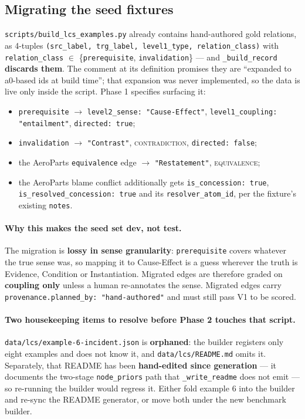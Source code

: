 \documentclass[11pt]{article}
\newcommand{\cCon}{\textsc{contradiction}}
\newcommand{\cEqv}{\textsc{equivalence}}
\begin{document}
\subsection{Migrating the seed fixtures}
\label{sec:migration}

\texttt{scripts/build\_lcs\_examples.py} already contains hand-authored gold relations, as
4-tuples \texttt{(src\_label, trg\_label, level1\_type, relation\_class)} with
\texttt{relation\_class} $\in$ \{\texttt{prerequisite}, \texttt{invalidation}\} --- and
\texttt{\_build\_record} \textbf{discards them}. The comment at its definition promises they
are ``expanded to a0-based ids at build time''; that expansion was never implemented, so the
data is live only inside the script. Phase 1 specifies surfacing it:

\begin{itemize}[leftmargin=*,nosep]
  \item \texttt{prerequisite} $\rightarrow$ \texttt{level2\_sense: "Cause-Effect"},
        \texttt{level1\_coupling: "entailment"}, \texttt{directed: true};
  \item \texttt{invalidation} $\rightarrow$ \texttt{"Contrast"}, \cCon, \texttt{directed: false};
  \item the AeroParts \texttt{equivalence} edge $\rightarrow$ \texttt{"Restatement"}, \cEqv;
  \item the AeroParts blame conflict additionally gets \texttt{is\_concession: true},
        \texttt{is\_resolved\_concession: true} and its \texttt{resolver\_atom\_id}, per the
        fixture's existing \texttt{notes}.
\end{itemize}

\paragraph{Why this makes the seed set dev, not test.} The migration is \textbf{lossy in sense
granularity}: \texttt{prerequisite} covers whatever the true sense was, so mapping it to
Cause-Effect is a guess wherever the truth is Evidence, Condition or Instantiation. Migrated
edges are therefore graded on \textbf{coupling only} unless a human re-annotates the sense.
Migrated edges carry \texttt{provenance.planned\_by: "hand-authored"} and must still pass V1 to
be scored.

\paragraph{Two housekeeping items to resolve before Phase 2 touches that script.}
\texttt{data/lcs/example-6-incident.json} is \textbf{orphaned}: the builder registers only
eight examples and does not know it, and \texttt{data/lcs/README.md} omits it. Separately, that
README has been \textbf{hand-edited since generation} --- it documents the two-stage
\texttt{node\_priors} path that \texttt{\_write\_readme} does not emit --- so re-running the
builder would regress it. Either fold example 6 into the builder and re-sync the README
generator, or move both under the new benchmark builder.
\end{document}
